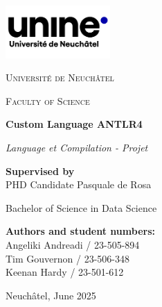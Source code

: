 \documentclass[12pt,a4paper]{article}
\begin{document}

\begin{titlepage}
    \centering
    \includegraphics[width=0.3\textwidth]{doc/logo.png}\vspace{0.5cm}

    {\scshape\LARGE Université de Neuchâtel \par}
    \vspace{1cm}
    {\scshape\Large Faculty of Science \par}
    \vspace{1.5cm}

    {\Huge\bfseries Custom Language ANTLR4 \par}

    {\Large\itshape Language et Compilation - Projet \par}
    \vspace{1cm}

            \textbf{Supervised by}\\
            PHD Candidate Pasquale de Rosa
    \vfill

    {\large Bachelor of Science in Data Science\par}
    \vspace{0.5cm}

    {\large \bfseries Authors and student numbers:}\\[0.2cm]
    Angeliki Andreadi / 23-505-894 \\
    Tim Gouvernon / 23-506-348 \\
    Keenan Hardy / 23-501-612 \\
    \vfill

    {\large Neuchâtel, June 2025\par}
\end{titlepage}

\newpage
\end{document}
